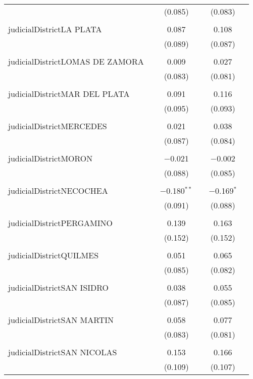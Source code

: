 \documentclass{article}
\begin{document}
\begin{table}[!htbp]
{\begin{tabular}{@{\extracolsep{5pt}}lccccc}
  &  & (0.085) &  & (0.083) &  \\ 
  & & & & & \\ 
 judicialDistrictLA PLATA &  & 0.087 &  & 0.108 &  \\ 
  &  & (0.089) &  & (0.087) &  \\ 
  & & & & & \\ 
 judicialDistrictLOMAS DE ZAMORA &  & 0.009 &  & 0.027 &  \\ 
  &  & (0.083) &  & (0.081) &  \\ 
  & & & & & \\ 
 judicialDistrictMAR DEL PLATA &  & 0.091 &  & 0.116 &  \\ 
  &  & (0.095) &  & (0.093) &  \\ 
  & & & & & \\ 
 judicialDistrictMERCEDES &  & 0.021 &  & 0.038 &  \\ 
  &  & (0.087) &  & (0.084) &  \\ 
  & & & & & \\ 
 judicialDistrictMORON &  & $-$0.021 &  & $-$0.002 &  \\ 
  &  & (0.088) &  & (0.085) &  \\ 
  & & & & & \\ 
 judicialDistrictNECOCHEA &  & $-$0.180$^{**}$ &  & $-$0.169$^{*}$ &  \\ 
  &  & (0.091) &  & (0.088) &  \\ 
  & & & & & \\ 
 judicialDistrictPERGAMINO &  & 0.139 &  & 0.163 &  \\ 
  &  & (0.152) &  & (0.152) &  \\ 
  & & & & & \\ 
 judicialDistrictQUILMES &  & 0.051 &  & 0.065 &  \\ 
  &  & (0.085) &  & (0.082) &  \\ 
  & & & & & \\ 
 judicialDistrictSAN ISIDRO &  & 0.038 &  & 0.055 &  \\ 
  &  & (0.087) &  & (0.085) &  \\ 
  & & & & & \\ 
 judicialDistrictSAN MARTIN &  & 0.058 &  & 0.077 &  \\ 
  &  & (0.083) &  & (0.081) &  \\ 
  & & & & & \\ 
 judicialDistrictSAN NICOLAS &  & 0.153 &  & 0.166 &  \\ 
  &  & (0.109) &  & (0.107) &  \\ 

\end{tabular}}
\end{table}
\end{document}
